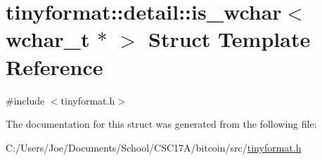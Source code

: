 \hypertarget{structtinyformat_1_1detail_1_1is__wchar_3_01wchar__t_01_5_01_4}{}\section{tinyformat\+:\+:detail\+:\+:is\+\_\+wchar$<$ wchar\+\_\+t $\ast$ $>$ Struct Template Reference}
\label{structtinyformat_1_1detail_1_1is__wchar_3_01wchar__t_01_5_01_4}


{\ttfamily \#include $<$tinyformat.\+h$>$}



The documentation for this struct was generated from the following file\+:\begin{DoxyCompactItemize}
\item 
C\+:/\+Users/\+Joe/\+Documents/\+School/\+C\+S\+C17\+A/bitcoin/src/\hyperlink{tinyformat_8h}{tinyformat.\+h}\end{DoxyCompactItemize}
